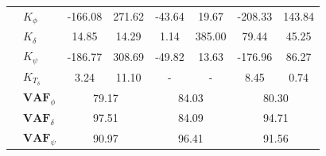 \begin{table}[]
\begin{tabular}{llcccccc}
                                 & $K_{\phi} $           & -166.08                                    & 271.62                                             & -43.64                                     & 19.67                                              & -208.33                                    & 143.84                                             \\
                                 & $K_\delta $           & 14.85                                      & 14.29                                              & 1.14                                       & 385.00                                             & 79.44                                      & 45.25                                              \\
                                 & $K_\psi $             & -186.77                                    & 308.69                                             & -49.82                                     & 13.63                                              & -176.96                                    & 86.27                                              \\
                                 & $K_{T_\delta}$        & 3.24                                       & 11.10                                              & -                                          & -                                                  & 8.45                                       & 0.74                                               \\ \cline{2-8} 
                                 & $\mathbf{VAF}_\phi$   & \multicolumn{2}{c}{79.17}                                                                       & \multicolumn{2}{c}{84.03}                                                                       & \multicolumn{2}{c}{80.30}                                                                       \\
                                 & $\mathbf{VAF}_\delta$ & \multicolumn{2}{c}{97.51}                                                                       & \multicolumn{2}{c}{84.09}                                                                       & \multicolumn{2}{c}{94.71}                                                                       \\
                                 & $\mathbf{VAF}_\psi$   & \multicolumn{2}{c}{90.97}                                                                       & \multicolumn{2}{c}{96.41}                                                                       & \multicolumn{2}{c}{91.56}                                                                      
    \end{tabular}
    \label{tb:no_delay}
    \end{table}
